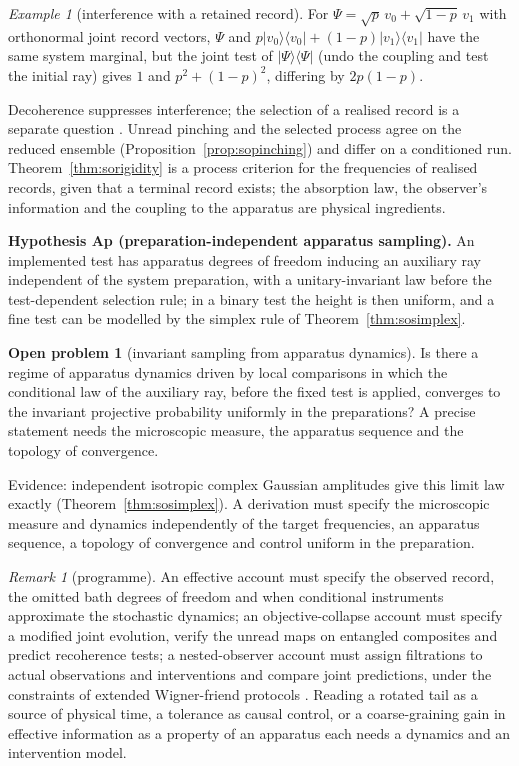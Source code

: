 \documentclass[aps,pra,onecolumn,superscriptaddress,nofootinbib,10pt]{revtex4-2}
\theoremstyle{definition}
\newtheorem{problem}{Open problem}
\theoremstyle{remark}
\newtheorem{remark}[theorem]{Remark}
\newtheorem{example}[theorem]{Example}
\begin{document}
\begin{example}[interference with a retained record]\label{ex:sorecoherence}
For $\Psi=\sqrt p\,v_0+\sqrt{1-p}\,v_1$ with orthonormal joint record vectors, $\Psi$ and $p\lvert v_0\rangle\langle v_0\rvert+(1-p)\lvert v_1\rangle\langle v_1\rvert$ have the same
system marginal, but the joint test of $\lvert\Psi\rangle\langle\Psi\rvert$ (undo the coupling and test the initial ray) gives $1$ and $p^2+(1-p)^2$,
differing by $2p(1-p)$.
\end{example}
\noindent Decoherence suppresses interference; the selection of a realised record is a separate
question \cite{n3:Schlosshauer}.  Unread pinching and the selected process agree on the reduced ensemble
(Proposition~\ref{prop:sopinching}) and differ on a conditioned run.  Theorem~\ref{thm:sorigidity} is a process criterion
for the frequencies of realised records, given that a terminal record exists; the absorption law, the
observer's information and the coupling to the apparatus are physical ingredients.

\smallskip\noindent\textbf{Hypothesis Ap (preparation-independent apparatus sampling).}\label{hyp:Ap}  An implemented test has
apparatus degrees of freedom inducing an auxiliary ray independent of the system preparation, with a
unitary-invariant law before the test-dependent selection rule; in a binary test the height is then
uniform, and a fine test can be modelled by the simplex rule of Theorem~\ref{thm:sosimplex}.

\begin{problem}[invariant sampling from apparatus dynamics]\label{conj:somixing}
Is there a regime of apparatus dynamics driven by local comparisons in which the conditional law of the
auxiliary ray, before the fixed test is applied, converges to the invariant projective probability
uniformly in the preparations?  A precise statement needs the microscopic measure, the apparatus sequence and
the topology of convergence.
\end{problem}
\noindent Evidence: independent isotropic complex Gaussian amplitudes give this limit law exactly
(Theorem~\ref{thm:sosimplex}).  A derivation must specify the microscopic measure and dynamics independently of the
target frequencies, an apparatus sequence, a topology of convergence and control uniform in the
preparation.

\begin{remark}[programme]\label{rem:soprogramme}
An effective account must specify the observed record, the omitted bath degrees of freedom and when
conditional instruments approximate the stochastic dynamics; an objective-collapse account must specify a
modified joint evolution, verify the unread maps on entangled composites and predict recoherence tests; a
nested-observer account must assign filtrations to actual observations and interventions and compare
joint predictions, under the constraints of extended Wigner-friend protocols \cite{n3:FR,n3:Bong}.
Reading a rotated tail as a source of physical time, a tolerance as causal control, or a coarse-graining
gain in effective information \cite{n3:Hoel} as a property of an apparatus each needs a dynamics and an
intervention model.
\end{remark}
\end{document}

